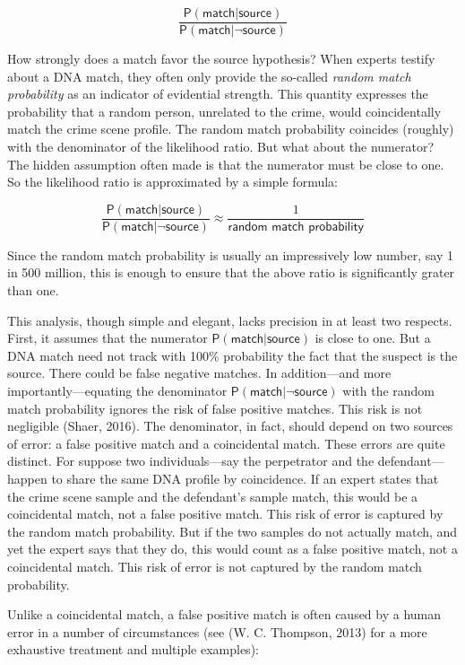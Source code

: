 \documentclass[
  letterpaper,
  DIV=11,
  numbers=noendperiod]{scrartcl}
\newcommand{\pr}[1]{\mathsf{P}(#1)}
\begin{document}
\[
\frac{\pr{\textsf{match} \vert \textsf{source}}}{\pr{\textsf{match} \vert \neg \textsf{source}}}
\]

How strongly does a match favor the source hypothesis? When experts
testify about a DNA match, they often only provide the so-called
\emph{random match probability} as an indicator of evidential strength.
This quantity expresses the probability that a random person, unrelated
to the crime, would coincidentally match the crime scene profile. The
random match probability coincides (roughly) with the denominator of the
likelihood ratio. But what about the numerator? The hidden assumption
often made is that the numerator must be close to one. So the likelihood
ratio is approximated by a simple formula:

\[
\frac{\pr{\textsf{match} \vert \textsf{source}}}{\pr{\textsf{match} \vert \neg \textsf{source}}}\approx\frac{1}{\textsf{random match probability}}
\]

Since the random match probability is usually an impressively low
number, say 1 in 500 million, this is enough to ensure that the above
ratio is significantly grater than one.

This analysis, though simple and elegant, lacks precision in at least
two respects. First, it assumes that the numerator
\(\pr{\textsf{match} \vert \textsf{source}}\) is close to one. But a DNA
match need not track with 100\% probability the fact that the suspect is
the source. There could be false negative matches. In addition---and
more importantly---equating the denominator
\(\pr{\textsf{match} \vert \neg \textsf{source}}\) with the random match
probability ignores the risk of false positive matches. This risk is not
negligible (Shaer, 2016). The denominator, in fact, should depend on two
sources of error: a false positive match and a coincidental match. These
errors are quite distinct. For suppose two individuals---say the
perpetrator and the defendant---happen to share the same DNA profile by
coincidence. If an expert states that the crime scene sample and the
defendant's sample match, this would be a coincidental match, not a
false positive match. This risk of error is captured by the random match
probability. But if the two samples do not actually match, and yet the
expert says that they do, this would count as a false positive match,
not a coincidental match. This risk of error is not captured by the
random match probability.

Unlike a coincidental match, a false positive match is often caused by a
human error in a number of circumstances (see (W. C. Thompson, 2013) for
a more exhaustive treatment and multiple examples):
\end{document}
